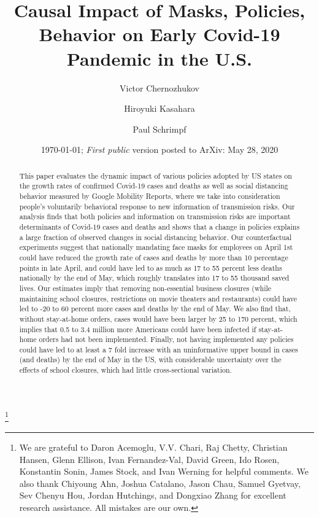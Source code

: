\documentclass[11pt,reqno,letter]{amsart}
\theoremstyle{definition}
\begin{document}
\title[Causal Impact of Masks, Policies, Behavior]
{Causal Impact of Masks, Policies, Behavior on Early Covid-19 Pandemic in the U.S.}\thanks{We are grateful to Daron Acemoglu, V.V. Chari, Raj Chetty,  Christian Hansen, Glenn Ellison, Ivan Fernandez-Val, David Green,  Ido Rosen, Konstantin Sonin, James Stock, and Ivan Werning for helpful comments. We also thank Chiyoung Ahn,
Joshua Catalano,  Jason Chau, Samuel Gyetvay, Sev Chenyu Hou,
Jordan Hutchings, and Dongxiao Zhang  for excellent research assistance.  All mistakes are our own. }


\author{Victor Chernozhukov}
\address{Department of Economics and Center for Statistics and Data Science, MIT,  MA 02139}
\author{Hiroyuki Kasahara}
\address{ Vancouver School of Economics, UBC, 6000 Iona Drive, Vancouver, BC.}

\author{Paul Schrimpf}
\address{ Vancouver School of Economics, UBC, 6000 Iona Drive, Vancouver, BC.}


\date{\today; \textit{First public} version posted to ArXiv:  May 28, 2020}

\begin{abstract}
This paper evaluates the dynamic impact of various policies adopted by US states on the growth rates of confirmed Covid-19  cases and deaths as well as social distancing behavior measured by Google Mobility Reports, where we take into consideration people's voluntarily behavioral response to new information of transmission risks. Our analysis finds that both policies and information on transmission risks are important determinants of Covid-19  cases and deaths and shows that a change in policies explains a large fraction of observed changes in social distancing behavior. Our counterfactual experiments suggest that nationally mandating face masks for employees on April 1st could have reduced the growth rate of cases and deaths  by more than 10 percentage points in late April, and could have led to as much as 17 to 55 percent less deaths nationally by the end of May, which roughly translates into 17 to 55 thousand saved lives.   Our estimates imply that removing non-essential business closures  (while maintaining school closures, restrictions on  movie theaters and restaurants)  could have led to -20 to 60 percent more cases and deaths by the end of May. We also find that, without stay-at-home orders, cases would have been larger by  25 to 170 percent, which implies that 0.5 to 3.4 million more Americans could have been infected if stay-at-home orders had not been implemented. Finally,  not having implemented any policies could have led to at least a 7 fold increase with an uninformative upper bound in cases (and deaths) by the end of May  in the US, with considerable uncertainty over the effects of school closures, which had little cross-sectional variation.%
\end{abstract}
\end{document}
